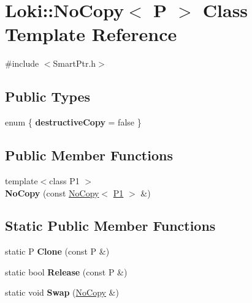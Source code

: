 \hypertarget{classLoki_1_1NoCopy}{}\section{Loki\+:\+:No\+Copy$<$ P $>$ Class Template Reference}
\label{classLoki_1_1NoCopy}


{\ttfamily \#include $<$Smart\+Ptr.\+h$>$}

\subsection*{Public Types}
\begin{DoxyCompactItemize}
\item 
\hypertarget{classLoki_1_1NoCopy_a763cd4b98d10571e494c4a6f3ca35efb}{}enum \{ {\bfseries destructive\+Copy} = false
 \}\label{classLoki_1_1NoCopy_a763cd4b98d10571e494c4a6f3ca35efb}

\end{DoxyCompactItemize}
\subsection*{Public Member Functions}
\begin{DoxyCompactItemize}
\item 
\hypertarget{classLoki_1_1NoCopy_ac07ad3320031acdb1f7810ef0460e96a}{}{\footnotesize template$<$class P1 $>$ }\\{\bfseries No\+Copy} (const \hyperlink{classLoki_1_1NoCopy}{No\+Copy}$<$ \hyperlink{structP1}{P1} $>$ \&)\label{classLoki_1_1NoCopy_ac07ad3320031acdb1f7810ef0460e96a}

\end{DoxyCompactItemize}
\subsection*{Static Public Member Functions}
\begin{DoxyCompactItemize}
\item 
\hypertarget{classLoki_1_1NoCopy_ac35ed8a9d8165009ce4019c14a325989}{}static P {\bfseries Clone} (const P \&)\label{classLoki_1_1NoCopy_ac35ed8a9d8165009ce4019c14a325989}

\item 
\hypertarget{classLoki_1_1NoCopy_a15bd1b90052160f5c314b6c69c67f0e3}{}static bool {\bfseries Release} (const P \&)\label{classLoki_1_1NoCopy_a15bd1b90052160f5c314b6c69c67f0e3}

\item 
\hypertarget{classLoki_1_1NoCopy_a073e9c49703330152632f5d7bf8cdcff}{}static void {\bfseries Swap} (\hyperlink{classLoki_1_1NoCopy}{No\+Copy} \&)\label{classLoki_1_1NoCopy_a073e9c49703330152632f5d7bf8cdcff}

\end{DoxyCompactItemize}


